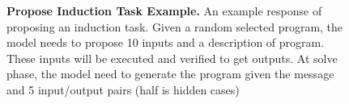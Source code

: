 \documentclass{article}
\begin{document}
\begin{figure}
    
    \caption{\textbf{Propose Induction Task Example.} An example response of proposing an induction task. Given a random selected program, the model needs to propose 10 inputs and a description of program. These inputs will be executed and verified to get outputs. At solve phase, the model need to generate the program given the message and 5 input/output pairs (half is hidden cases)}
    \label{fig:gen_code_f_example}
\end{figure}
\end{document}
